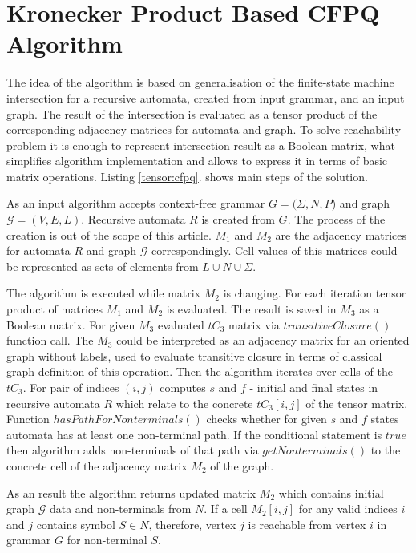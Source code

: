 \section{Kronecker Product Based CFPQ Algorithm}


The idea of the algorithm is based on generalisation of the finite-state machine intersection for a recursive automata, created from input grammar, and an input graph. The result of the intersection is evaluated as a tensor product of the corresponding adjacency matrices for automata and graph. To solve reachability problem it is enough to represent intersection result as a Boolean matrix, what simplifies algorithm implementation and allows to express it in terms of basic matrix operations. Listing \ref{tensor:cfpq}. shows main steps of the solution.

As an input algorithm accepts context-free grammar $G=(\Sigma,N,P$) and graph $\mathcal{G}=(V,E,L)$. Recursive automata $R$ is created from $G$. The process of the creation is out of the scope of this article. $M_1$ and $M_2$ are the adjacency matrices for automata $R$ and graph $\mathcal{G}$ correspondingly. Cell values of this matrices could be represented as sets of elements from $L \cup N \cup \Sigma$. 

The algorithm is executed while matrix $M_2$ is changing. For each iteration tensor product of matrices $M_1$ and $M_2$ is evaluated.  The result is saved in $M_3$ as a Boolean matrix. For given $M_3$ evaluated $tC_3$ matrix via $transitiveClosure()$ function call. The $M_3$ could be interpreted as an adjacency matrix for an oriented graph without labels, used to evaluate transitive closure in terms of classical graph definition of this operation. Then the algorithm iterates over cells of the $tC_3$. For pair of indices $(i,j)$ computes $s$ and $f$ - initial and final states in recursive automata $R$ which relate to the concrete $tC_3[i,j]$ of the tensor matrix. Function $hasPathForNonterminals()$ checks whether for given $s$ and $f$ states automata has at least one non-terminal path. If the conditional statement is $true$ then algorithm adds non-terminals of that path via $getNonterminals()$ to the concrete cell of the adjacency matrix $M_2$ of the graph.

As an result the algorithm returns updated matrix $M_2$ which contains initial graph $\mathcal{G}$ data and non-terminals from $N$. If a cell $M_2[i,j]$ for any valid indices $i$ and $j$ contains symbol $S \in N$, therefore, vertex $j$ is reachable from vertex $i$ in grammar $G$ for non-terminal $S$. 


